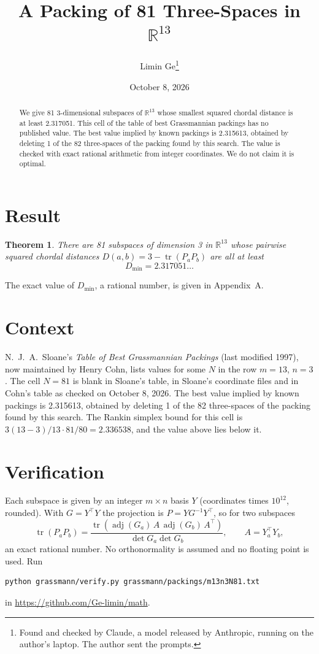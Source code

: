 \documentclass[11pt,a4paper]{article}
\title{A Packing of 81 Three-Spaces in $\mathbb{R}^{13}$}
\author{Limin Ge\thanks{Found and checked by Claude, a model released by Anthropic, running on the author's laptop. The author sent the prompts.}}
\date{October 8, 2026}
\newtheorem*{theorem}{Theorem}
\begin{document}
\maketitle
\begin{abstract}
We give 81 3-dimensional subspaces of $\mathbb{R}^{13}$ whose smallest squared chordal distance is at least 2.317051. This cell of the table of best Grassmannian packings has no published value. The best value implied by known packings is 2.315613, obtained by deleting 1 of the 82 three-spaces of the packing found by this search. The value is checked with exact rational arithmetic from integer coordinates. We do not claim it is optimal.
\end{abstract}

\section{Result}
\begin{theorem}
There are 81 subspaces of dimension 3 in $\mathbb{R}^{13}$ whose pairwise squared chordal distances $D(a,b) = 3 - \operatorname{tr}(P_aP_b)$ are all at least
\[ D_{\min} = 2.317051\ldots \]
\end{theorem}
The exact value of $D_{\min}$, a rational number, is given in Appendix~A.


\section{Context}
N.~J.~A.~Sloane's \emph{Table of Best Grassmannian Packings} (last modified 1997), now maintained by Henry Cohn, lists values for some $N$ in the row $m=13$, $n=3$. The cell $N=81$ is blank in Sloane's table, in Sloane's coordinate files and in Cohn's table as checked on October 8, 2026. The best value implied by known packings is 2.315613, obtained by deleting 1 of the 82 three-spaces of the packing found by this search. The Rankin simplex bound for this cell is $3(13-3)/13\cdot 81/80 = 2.336538$, and the value above lies below it.


\section{Verification}
Each subspace is given by an integer $m\times n$ basis $Y$ (coordinates times $10^{12}$, rounded). With $G=Y^\top Y$ the projection is $P=YG^{-1}Y^\top$, so for two subspaces
\[ \operatorname{tr}(P_aP_b)=\frac{\operatorname{tr}(\operatorname{adj}(G_a)\,A\,\operatorname{adj}(G_b)\,A^\top)}{\det G_a\det G_b},\qquad A=Y_a^\top Y_b, \]
an exact rational number. No orthonormality is assumed and no floating point is used. Run
\begin{verbatim}
python grassmann/verify.py grassmann/packings/m13n3N81.txt
\end{verbatim}
in \url{https://github.com/Ge-limin/math}.
\end{document}
